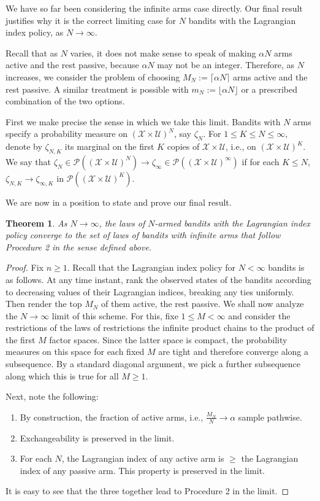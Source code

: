\documentclass[12pt]{article}
\newtheorem{theorem}{Theorem}[section]
\numberwithin{equation}{section}
\newcommand{\PA}{\mathcal{P}}
\newcommand{\1}{\textbf{1}}
\newcommand{\U}{\mathcal{U}}
\newcommand{\X}{\mathcal{X}}
\begin{document}
We have so far been considering the infinite arms case directly. Our final result justifies why it is the correct limiting case for $N$ bandits with the Lagrangian index policy, as $N\to\infty$.

Recall that as $N$ varies, it does not make sense to speak of making $\alpha N$ arms active and the rest passive, because $\alpha N$ may not be an integer. Therefore, as $N$ increases, we consider the problem of choosing $M_N := \lceil\alpha N\rceil$ arms active and the rest passive. A similar treatment is possible with $m_N := \lfloor\alpha N\rfloor$ or a prescribed combination of the two options. 

First we make precise the sense in which we take this limit. Bandits with $N$ arms specify a probability measure on $(\X\times\U)^N$, say $\zeta_N$. For $1 \leq K \leq N \leq \infty$, denote by $\zeta_{N,K}$ its marginal on the first $K$ copies of $\X\times\U$, i.e., on $(\X\times\U)^K$.  We say that $\zeta_N \in \PA((\X\times\U)^N) \to \zeta_\infty \in \PA((\X\times\U)^\infty)$ if for each $K \leq N$, $\zeta_{N,K} \to \zeta_{\infty,K}$ in $\PA((\X\times\U)^K)$.
    
We are now in a position to state and prove our final result.


\begin{theorem} As $N \to \infty$, the laws of $N$-armed bandits with the Lagrangian index policy converge to the set of laws of bandits with infinite arms that follow Procedure 2 in the sense defined above.
\end{theorem}
\begin{proof} Fix $n \geq 1$. Recall that the Lagrangian index policy for $N < \infty$ bandits is as follows.  At any time instant, rank the observed states of the bandits according to decreasing values of their Lagrangian indices, breaking any ties uniformly. Then render the top $M_N$ of them active, the rest passive. We shall now analyze the $N\to\infty$ limit of this scheme. For this, fixe $1 \leq M < \infty$ and consider the restrictions of the laws of restrictions the infinite product chains to the product of the first $M$ factor spaces. Since the latter space is compact, the probability measures on this space for each fixed $M$ are tight and therefore converge along a subsequence. By a standard diagonal argument, we pick a further subsequence along which this is true for all $M \geq 1$. 

Next, note the following:
\begin{enumerate}

\item By construction, the fraction of active arms, i.e., $\frac{M_N}{N} \to \alpha$ sample pathwise.

\item Exchangeability is preserved in the limit.    

\item For each $N$, the Lagrangian index of any active arm is $\geq$ the Lagrangian index of any passive arm. This property is preserved in the limit.
\end{enumerate}
It is easy to see that the three together lead to Procedure 2 in the limit. 
\end{proof}
\end{document}
